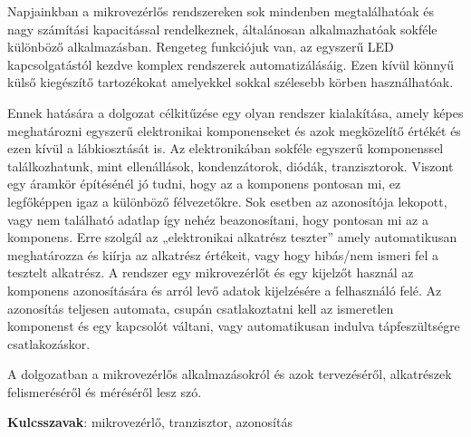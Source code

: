 Napjainkban a mikrovezérlős rendszereken sok mindenben megtalálhatóak és
nagy számítási kapacitással rendelkeznek, általánosan
alkalmazhatóak sokféle különböző alkalmazásban. Rengeteg funkciójuk van,
az egyszerű LED kapcsolgatástól kezdve komplex rendszerek automatizálásáig.
Ezen kívül könnyű külső kiegészítő tartozékokat amelyekkel sokkal
szélesebb körben használhatóak.

Ennek hatására a dolgozat célkitűzése egy olyan rendszer kialakítása,
amely képes meghatározni egyszerű elektronikai komponenseket és azok
megközelítő értékét és ezen kívül a lábkiosztását is. 
Az elektronikában sokféle egyszerű komponenssel találkozhatunk,
mint ellenállások, kondenzátorok, diódák, tranzisztorok. 
Viszont egy áramkör
építésénél jó tudni, hogy az a komponens pontosan mi, ez legfőképpen
igaz a különböző félvezetőkre. Sok esetben az azonosítója lekopott,
vagy nem található adatlap így nehéz beazonosítani, hogy pontosan mi
az a komponens. Erre szolgál az „elektronikai alkatrész teszter” amely
automatikusan meghatározza és kiírja az alkatrész értékeit, vagy 
hogy hibás/nem ismeri fel a tesztelt alkatrész. A rendszer egy mikrovezérlőt
és egy kijelzőt használ az komponens azonosítására és arról levő adatok
kijelzésére a felhasználó felé. Az azonosítás teljesen automata,
csupán csatlakoztatni kell az ismeretlen komponenst és egy kapcsolót
váltani, vagy automatikusan indulva tápfeszültségre csatlakozáskor.

A dolgozatban a mikrovezérlős alkalmazásokról és azok tervezéséről,
alkatrészek felismeréséről és méréséről lesz szó.

\textbf{Kulcsszavak}: mikrovezérlő, tranzisztor, azonosítás
